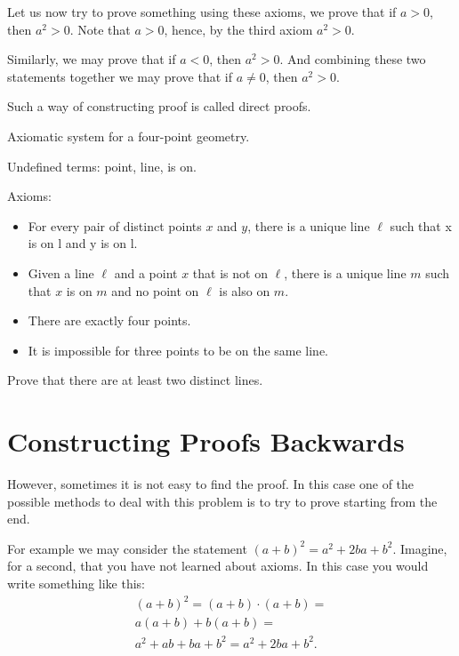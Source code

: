 Let us now try to prove something using these axioms, we prove that if $a > 0$,
then $a^2 > 0$. Note that $a > 0$, hence, by the third axiom $a^2 > 0$.

Similarly, we may prove that if $a < 0$, then $a^2 > 0$. And combining these
two statements together we may prove that if $a \neq 0$, then $a^2 > 0$.

Such a way of constructing proof is called direct proofs.

\begin{exercise}
  Axiomatic system for a four-point geometry.

  Undefined terms: point, line, is on.

  Axioms:
  \begin{itemize}
    \item For every pair of distinct points $x$ and $y$, there is a unique line
      $\ell$ such that x is on l and y is on l.
    \item Given a line $\ell$ and a point $x$ that is not on $\ell$, there is a
      unique line $m$ such that $x$ is on $m$ and no point on $\ell$ is also on
      $m$.
    \item There are exactly four points.
    \item It is impossible for three points to be on the same line.
  \end{itemize}
  Prove that there are at least two distinct lines.
\end{exercise}

\section{Constructing Proofs Backwards}
However, sometimes it is not easy to find the proof. In this case one of the
possible methods to deal with this problem is to try to prove starting from
the end.

For example we may consider the statement $(a + b)^2 = a^2 + 2ba + b^2$.
Imagine, for a second, that you have not learned about axioms.
In this case you would write something like this:
\begin{multline*}
    (a + b)^2 = (a + b) \cdot (a + b) = \\
    a (a + b) + b (a + b) = \\
    a^2 + ab + ba + b^2 = a^2 + 2ba + b^2.
\end{multline*}

